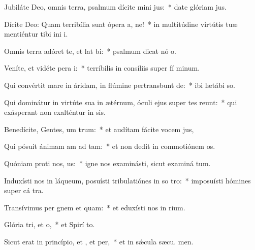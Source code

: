 \item Jubiláte Deo, omnis terra, psalmum dícite mini jus:~* date glóriam  jus.
\item Dícite Deo: Quam terribília sunt ópera a, ne!~* in multitúdine virtútis tuæ mentiéntur tibi ini i.
\item Omnis terra adóret te, et lat bi:~* psalmum dicat nó o.
\item Veníte, et vidéte pera i:~* terríbilis in consíliis super fí minum.
\item Qui convértit mare in áridam, in flúmine pertransbunt de:~* ibi lætábi  so.
\item Qui dominátur in virtúte sua in ætérnum, óculi ejus super tes reunt:~* qui exásperant non exalténtur in sis.
\item Benedícite, Gentes, um trum:~* et audítam fácite vocem  jus,
\item Qui pósuit ánimam am ad tam:~* et non dedit in commotiónem  os.
\item Quóniam proti nos, us:~* igne nos examinásti, sicut examiná tum.
\item Induxísti nos in láqueum, posuísti tribulatiónes in so tro:~* imposuísti hómines super cá tra.
\item Transívimus per gnem et quam:~* et eduxísti nos in rium.
\item Glória tri, et o,~* et Spirí to.
\item Sicut erat in princípio, et , et per,~* et in sǽcula sæcu. men.
